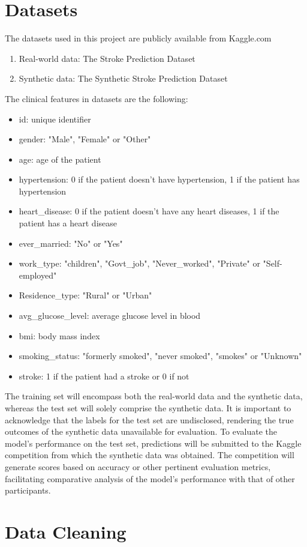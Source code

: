 \documentclass{article}
\begin{document}
\section{Datasets}
The datasets used in this project are publicly available from Kaggle.com
\begin{enumerate}
  \item Real-world data: The Stroke Prediction Dataset
  \item Synthetic data: The Synthetic Stroke Prediction Dataset
\end{enumerate}
The clinical features in datasets are the following:
\begin{itemize}
  \item id: unique identifier
  \item gender: "Male", "Female" or "Other"
  \item age: age of the patient
  \item hypertension: 0 if the patient doesn’t have hypertension, 1 if the patient has hypertension
  \item heart\_disease: 0 if the patient doesn’t have any heart diseases, 1 if the patient has a heart disease
  \item ever\_married: "No" or "Yes"
  \item work\_type: "children", "Govt\_job", "Never\_worked", "Private" or "Self-employed"
  \item Residence\_type: "Rural" or "Urban"
  \item avg\_glucose\_level: average glucose level in blood
  \item bmi: body mass index
  \item smoking\_status: "formerly smoked", "never smoked", "smokes" or "Unknown"
  \item stroke: 1 if the patient had a stroke or 0 if not
\end{itemize}
The training set will encompass both the real-world data and the synthetic data, whereas the test set will solely comprise the synthetic data. It is important to acknowledge that the labels for the test set are undisclosed, rendering the true outcomes of the synthetic data unavailable for evaluation. To evaluate the model's performance on the test set, predictions will be submitted to the Kaggle competition from which the synthetic data was obtained. The competition will generate scores based on accuracy or other pertinent evaluation metrics, facilitating comparative analysis of the model's performance with that of other participants.
\section{Data Cleaning}
\end{document}
